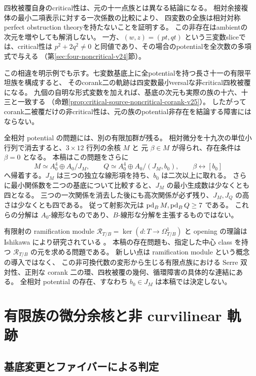 四枚被覆自身のcritical性は、元の十一点族とは異なる結論になる。
相対余接複体の最小二項表示に対する一次係数の比較により、
四変数の全族は相対対称perfect obstruction theoryを持たないことを証明する。
この非存在はambientの次元を増やしても解消しない。
一方、$(w,z)=(pt,qt)$ という三変数sliceでは、critical性は
$p^2+2q^2\ne0$ と同値であり、その場合のpotentialを全次数の多項式で与える
（第\ref{sec:four-noncritical-v24}節）。

この相違を明示例でも示す。七変数基底上に全potentialを持つ長さ十一の有限平坦族を構成すると、
そのcorank二の軌跡は四変数最小versalな非critical四枚被覆になる。
九個の自明な形式変数を加えれば、基底の次元も実際の族の十六、十三と一致する
（命題\ref{prop:critical-source-noncritical-corank-v25}）。
したがってcorank二被覆だけの非critical性は、元の族のpotential非存在を結論する障害にはならない。

全相対 potential の問題には、別の有限加群が残る。
相対微分を十九次の単位小行列で消去すると、$3\times12$ 行列の余核 $M$ と
元 $\beta\in M$ が得られ、存在条件は $\beta=0$ となる。
本稿はこの問題をさらに
\[
 M\simeq A_0^4\oplus A_0/J_M,\qquad
 Q\simeq A_0^4\oplus A_0/(J_M,b_0),\qquad
 \beta\longleftrightarrow[b_0]
\]
へ帰着する。$J_M$ は三つの独立な線形項を持ち、$b_0$ は二次以上に取れる。
さらに最小関係数を二つの基底について比較すると、$J_M$ の最小生成数は少なくとも四となる。
三つの一次関係を消去した後にも高次関係が必ず残り、$J_M,J_Q$ の高さは少なくとも四である。
従って射影次元は $\operatorname{pd}_BM,\operatorname{pd}_BQ\ge7$ である。
これらの分解は $A_0$-線形なものであり、$B$-線形な分解を主張するものではない。

有限射の ramification module
$\mathscr R_{T/B}=\ker(d:T\to\Omega^1_{T/B})$ と opening の理論は
Ishikawa により研究されている \cite{IshikawaOpenings,IshikawaFrontal}。
本稿の存在問題も、指定した中心 class を持つ $\mathscr R_{T/B}$ の元を求める問題である。
新しい点は ramification module という概念の導入ではなく、
この非可換代数の変形から生じる有限点族における
Serre 双対性、正則な corank 二の環、四枚被覆の幾何、循環障害の具体的な連結にある。
全相対 potential の存在、すなわち $b_0\in J_M$ は本稿では決定しない。

\section{有限族の微分余核と非 curvilinear 軌跡}\label{sec:support}

\subsection{基底変更とファイバーによる判定}

